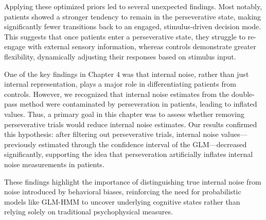 Applying these optimized priors led to several unexpected findings. Most notably, patients showed a stronger tendency to remain in the perseverative state, making significantly fewer transitions back to an engaged, stimulus-driven decision mode. This suggests that once patients enter a perseverative state, they struggle to re-engage with external sensory information, whereas controls demonstrate greater flexibility, dynamically adjusting their responses based on stimulus input.

One of the key findings in Chapter 4 was that internal noise, rather than just internal representation, plays a major role in differentiating patients from controls. However, we recognized that internal noise estimates from the double-pass method were contaminated by perseveration in patients, leading to inflated values. Thus, a primary goal in this chapter was to assess whether removing perseverative trials would reduce internal noise estimates. Our results confirmed this hypothesis: after filtering out perseverative trials, internal noise values—previously estimated through the confidence interval of the GLM—decreased significantly, supporting the idea that perseveration artificially inflates internal noise measurements in patients.

These findings highlight the importance of distinguishing true internal noise from noise introduced by behavioral biases, reinforcing the need for probabilistic models like GLM-HMM to uncover underlying cognitive states rather than relying solely on traditional psychophysical measures.